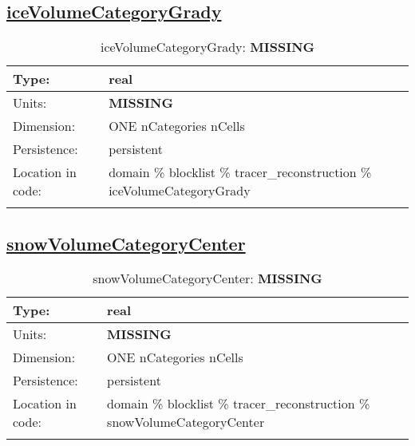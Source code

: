 \subsection[iceVolumeCategoryGrady]{\hyperref[sec:var_tab_tracer_reconstruction]{iceVolumeCategoryGrady}}
\label{subsec:var_sec_tracer_reconstruction_iceVolumeCategoryGrady}
\begin{center}
\begin{longtable}{| p{2.0in} | p{4.0in} |}
        \hline 
        Type: & real \\
        \hline 
        Units: & {\bf \color{red} MISSING} \\
        \hline 
        Dimension: & ONE nCategories nCells \\
        \hline 
        Persistence: & persistent \\
        \hline 
         Location in code: & domain \% blocklist \% tracer\_reconstruction \% iceVolumeCategoryGrady \\
         \hline 
    \caption{iceVolumeCategoryGrady: {\bf \color{red} MISSING}}
\end{longtable}
\end{center}
\subsection[snowVolumeCategoryCenter]{\hyperref[sec:var_tab_tracer_reconstruction]{snowVolumeCategoryCenter}}
\label{subsec:var_sec_tracer_reconstruction_snowVolumeCategoryCenter}
\begin{center}
\begin{longtable}{| p{2.0in} | p{4.0in} |}
        \hline 
        Type: & real \\
        \hline 
        Units: & {\bf \color{red} MISSING} \\
        \hline 
        Dimension: & ONE nCategories nCells \\
        \hline 
        Persistence: & persistent \\
        \hline 
         Location in code: & domain \% blocklist \% tracer\_reconstruction \% snowVolumeCategoryCenter \\
         \hline 
    \caption{snowVolumeCategoryCenter: {\bf \color{red} MISSING}}
\end{longtable}
\end{center}

